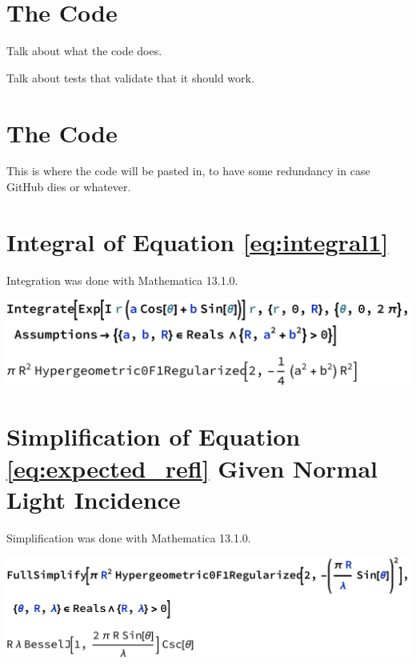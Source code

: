 \documentclass[etd,oneside,senior]{BYUPhys}
\begin{document}
\chapter{The Code}\label{chap:code} %

Talk about what the code does.

Talk about tests that validate that it should work.







\begin{appendices}

  \chapter{The Code}\label{chap:julia}
  
  This is where the code will be pasted in, to have some redundancy in case GitHub dies or whatever.
  
  
  
  \chapter{Integral of Equation \ref{eq:integral1}}\label{chap:integral}
  
  Integration was done with Mathematica 13.1.0.
  
  \includegraphics[width=\textwidth]{nasty-integral.pdf}
  
  
  
  \chapter{Simplification of Equation \ref{eq:expected_refl} Given Normal Light Incidence}\label{chap:airy_validation}
  
  Simplification was done with Mathematica 13.1.0.
  
  \includegraphics[width=\textwidth]{airy-simplification.pdf}
  
\end{appendices}








\printindex
\end{document}
